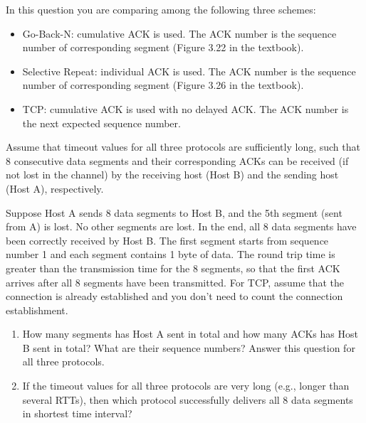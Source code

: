 \documentclass{report}
\begin{document}
\newpage
\begin{problem}
In this question you are comparing among the following three schemes:
\begin{itemize}
    \item Go-Back-N: cumulative ACK is used. The ACK number is the sequence number of corresponding segment (Figure 3.22 in the textbook).
    \item Selective Repeat: individual ACK is used. The ACK number is the sequence number of corresponding segment (Figure 3.26 in the textbook).
    \item TCP: cumulative ACK is used with no delayed ACK. The ACK number is the next expected sequence number.
\end{itemize}

Assume that timeout values for all three protocols are sufficiently long, such that 8 consecutive data segments and their corresponding ACKs can be received (if not lost in the channel) by the receiving host (Host B) and the sending host (Host A), respectively.

Suppose Host A sends 8 data segments to Host B, and the 5th segment (sent from A) is lost. No other segments are lost.
In the end, all 8 data segments have been correctly received by Host B. The first segment starts from sequence number 1 and each segment contains 1 byte of data. The round trip time is greater than the transmission time for the 8 segments, so that the first ACK arrives after all 8 segments have been transmitted. For TCP, assume that the connection is already established and you don't need to count the connection establishment.

\begin{enumerate}
  \item How many segments has Host A sent in total and how many ACKs has Host B sent in total? What are their sequence numbers? Answer this question for all three protocols.
  \item If the timeout values for all three protocols are very long (e.g., longer than several RTTs), then which protocol successfully delivers all 8 data segments in shortest time interval?
\end{enumerate}


\end{problem}
\end{document}
